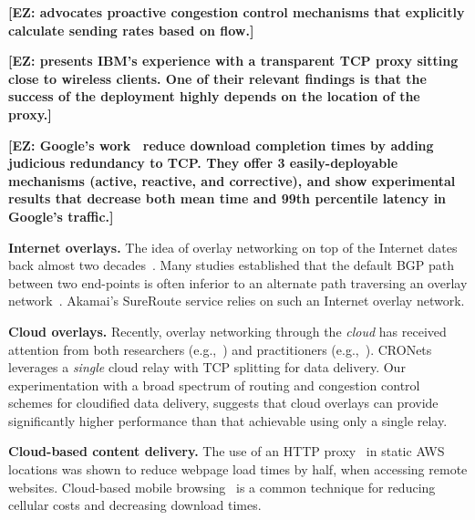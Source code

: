 \documentclass[sigconf,usenames,dvipsnames,geometry]{acmart}
\newcommand{\mycomm}[3]{{\color{#2} \textbf{[#1: #3]}}}
\newcommand{\mycomm}[3]{}
\newcommand{\IK}[1]{\mycomm{IK}{blue}{#1}}
\newcommand{\EZ}[1]{\mycomm{EZ}{BlueGreen}{#1}}
\newcommand{\T}[1]{\smallskip\noindent\textbf{#1}} %
\begin{document}
\EZ{\cite{jose2015proactive} advocates proactive congestion control mechanisms that explicitly calculate sending rates based on flow.}

\EZ{\cite{le2015experiences} presents IBM's experience with a transparent TCP proxy sitting close to wireless clients. One of their relevant findings is that the success of the deployment highly depends on the location of the proxy.}

\EZ{Google's work~\cite{flach2013reducing} reduce download completion times by adding judicious redundancy to TCP. They offer 3 easily-deployable mechanisms (active, reactive, and corrective), and show experimental results that decrease both mean time and 99th percentile latency in Google's traffic.}

\T{Internet overlays.} The idea of overlay networking on top of the Internet dates back almost two decades~\cite{old-overlay-1, old-overlay-2, RON}. Many studies established that the default BGP path between two end-points is often inferior to an alternate path traversing an overlay network~\cite{old-overlay-1, old-overlay-2, RON, akamai-2, akamai-3, akamai-4}. Akamai's SureRoute service relies on such an Internet overlay network.

\T{Cloud overlays.} Recently, overlay networking through the \emph{cloud} has received attention from both researchers (e.g.,~\cite{CRONets}) and practitioners (e.g.,~\cite{teridion}). CRONets~\cite{CRONets} leverages a \emph{single} cloud relay with TCP splitting for data delivery. Our experimentation with a broad spectrum of routing and congestion control schemes for cloudified data delivery, suggests that cloud overlays can provide significantly higher performance than that achievable using only a single relay.

\T{Cloud-based content delivery.} The use of an HTTP proxy~\cite{cgn2017} in static AWS locations was shown to reduce webpage load times by half, when accessing remote websites. Cloud-based mobile browsing~\cite{zhao2011reducing,wang2013accelerating} is a common technique for reducing cellular costs and decreasing download times.
\end{document}
